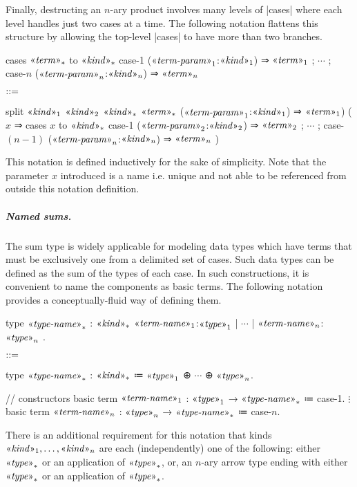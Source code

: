 \newpage
Finally, destructing an $n$-ary product involves many levels of \code|cases| where each level handles just two cases at a time.
The following notation flattens this structure by allowing the top-level \code|cases| to have more than two branches.
\begin{notational}[caption={Notation for destructing $n$-ary sum types}, label={lst:not-desctruct-n-sum-type}]
cases $\mvar{term}_*$ to $\mvar{kind}_*$
  { case-1 ($\mvar{term-param}_1$:$\mvar{kind}_1$) ⇒ $\mvar{term}_1$
  ; $\cdots$
  ; case-$n$ ($\mvar{term-param}_n$:$\mvar{kind}_n$) ⇒ $\mvar{term}_n$ }

$\syneq$

split $\mvar{kind}_1$ $\mvar{kind}_2$ $\mvar{kind}_*$
  $\mvar{term}_*$
  ($\mvar{term-param}_1$:$\mvar{kind}_1$) ⇒ $\mvar{term}_1$)
  ($x$ ⇒ cases $x$ to $\mvar{kind}_*$
          { case-1 ($\mvar{term-param}_2$:$\mvar{kind}_2$) ⇒ $\mvar{term}_2$
          ; $\cdots$
          ; case-$(n-1)$ ($\mvar{term-param}_n$:$\mvar{kind}_n$) ⇒ $\mvar{term}_n$ })
\end{notational}
This notation is defined inductively for the sake of simplicity.
Note that the parameter $x$ introduced is a  name i.e. unique and not able to be referenced from outside this notation definition.

\newpage
\subparagraph{Named sums.}
The sum type is widely applicable for modeling data types which have terms that must be exclusively one from a delimited set of cases.
Such data types can be defined as the sum of the types of each case.
In such constructions, it is convenient to name the components as basic terms.
The following notation provides a conceptually-fluid way of defining them.
\begin{notational}[caption={Notation for defining named sum types and constructing named sum terms}]
type $\mvar{type-name}_*$ : $\mvar{kind}_*$
  { $\mvar{term-name}_1$:$\mvar{type}_1$ | $\cdots$ | $\mvar{term-name}_n$:$\mvar{type}_n$ }.

$\syneq$

type $\mvar{type-name}_*$ : $\mvar{kind}_*$ ≔ $\mvar{type}_1$ ⊕ $\cdots$ ⊕ $\mvar{type}_n$.

// constructors
basic term $\mvar{term-name}_1$ : $\mvar{type}_1$ → $\mvar{type-name}_*$ ≔ case-1.
$\vdots$
basic term $\mvar{term-name}_n$ : $\mvar{type}_n$ → $\mvar{type-name}_*$ ≔ case-$n$.
\end{notational}
There is an additional requirement for this notation that kinds $\mvar{kind}_1, \dots, \mvar{kind}_n$ are each (independently) one of the following:
either $\mvar{type}_*$ or an application of $\mvar{type}_*$, or,
an $n$-ary arrow type ending with either $\mvar{type}_*$ or an application of $\mvar{type}_*$.

